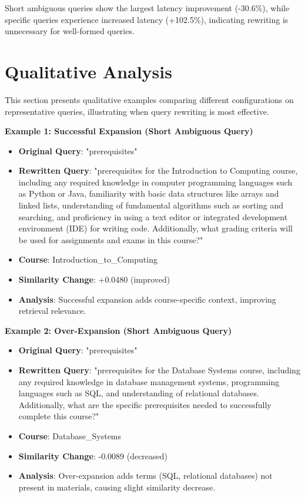 Short ambiguous queries show the largest latency improvement (-30.6\%), while specific queries experience increased latency (+102.5\%), indicating rewriting is unnecessary for well-formed queries.

\section{Qualitative Analysis}

This section presents qualitative examples comparing different configurations on representative queries, illustrating when query rewriting is most effective.

\textbf{Example 1: Successful Expansion (Short Ambiguous Query)}
\begin{itemize}
    \item \textbf{Original Query}: "prerequisites"
    \item \textbf{Rewritten Query}: "prerequisites for the Introduction to Computing course, including any required knowledge in computer programming languages such as Python or Java, familiarity with basic data structures like arrays and linked lists, understanding of fundamental algorithms such as sorting and searching, and proficiency in using a text editor or integrated development environment (IDE) for writing code. Additionally, what grading criteria will be used for assignments and exams in this course?"
    \item \textbf{Course}: Introduction\_to\_Computing
    \item \textbf{Similarity Change}: +0.0480 (improved)
    \item \textbf{Analysis}: Successful expansion adds course-specific context, improving retrieval relevance.
\end{itemize}

\textbf{Example 2: Over-Expansion (Short Ambiguous Query)}
\begin{itemize}
    \item \textbf{Original Query}: "prerequisites"
    \item \textbf{Rewritten Query}: "prerequisites for the Database Systems course, including any required knowledge in database management systems, programming languages such as SQL, and understanding of relational databases. Additionally, what are the specific prerequisites needed to successfully complete this course?"
    \item \textbf{Course}: Database\_Systems
    \item \textbf{Similarity Change}: -0.0089 (decreased)
    \item \textbf{Analysis}: Over-expansion adds terms (SQL, relational databases) not present in materials, causing slight similarity decrease.
\end{itemize}

